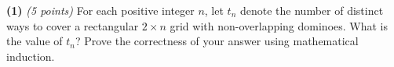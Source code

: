 \documentclass[12pt]{article}
\begin{document}
\setlength{\parindent}{0in}
\addtolength{\parskip}{0.1cm}
\setlength{\fboxrule}{.5mm}\setlength{\fboxsep}{1.2mm}
\newlength{\boxlength}\setlength{\boxlength}{\textwidth}
\addtolength{\boxlength}{-4mm}
\begin{center}
\end{center}
\vspace{5mm}

{\bf (1)} {\em (5 points)}
For each positive integer $n$, let $t_n$ denote
the number of distinct ways to cover
a rectangular $2 \times n$ grid
with non-overlapping dominoes.
What is the value of $t_n$?
Prove the correctness of
your answer using mathematical induction.

\end{document}
